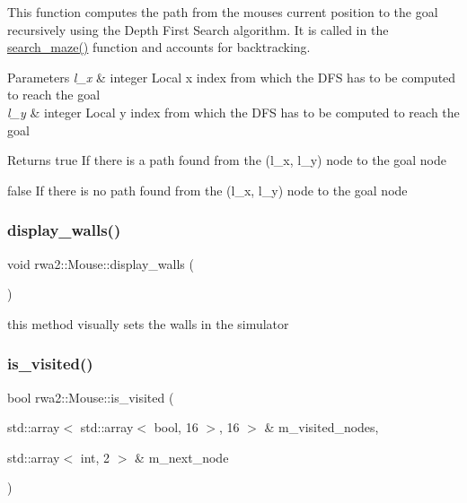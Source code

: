 This function computes the path from the mouse\textquotesingle{}s current position to the goal recursively using the Depth First Search algorithm. It is called in the \hyperlink{classrwa2_1_1_mouse_a789be287a432bafc903c97396a014d7d}{search\+\_\+maze()} function and accounts for backtracking. 


\begin{DoxyParams}{Parameters}
{\em l\+\_\+x} & integer Local x index from which the D\+FS has to be computed to reach the goal \\
\hline
{\em l\+\_\+y} & integer Local y index from which the D\+FS has to be computed to reach the goal \\
\hline
\end{DoxyParams}
\begin{DoxyReturn}{Returns}
true If there is a path found from the (l\+\_\+x, l\+\_\+y) node to the goal node 

false If there is no path found from the (l\+\_\+x, l\+\_\+y) node to the goal node 
\end{DoxyReturn}
\mbox{\label{classrwa2_1_1_mouse_abbcc99c41fd073426fdfd790f947956e}} 
\subsubsection{\texorpdfstring{display\+\_\+walls()}{display\_walls()}}
{\footnotesize\ttfamily void rwa2\+::\+Mouse\+::display\+\_\+walls (\begin{DoxyParamCaption}{ }\end{DoxyParamCaption})}



this method visually sets the walls in the simulator 

\mbox{\label{classrwa2_1_1_mouse_affc9c085e88aa2dbf07df41bc0596473}} 
\subsubsection{\texorpdfstring{is\+\_\+visited()}{is\_visited()}}
{\footnotesize\ttfamily bool rwa2\+::\+Mouse\+::is\+\_\+visited (\begin{DoxyParamCaption}\item[{std\+::array$<$ std\+::array$<$ bool, 16 $>$, 16 $>$ \&}]{m\+\_\+visited\+\_\+nodes,  }\item[{std\+::array$<$ int, 2 $>$ \&}]{m\+\_\+next\+\_\+node }\end{DoxyParamCaption})}



